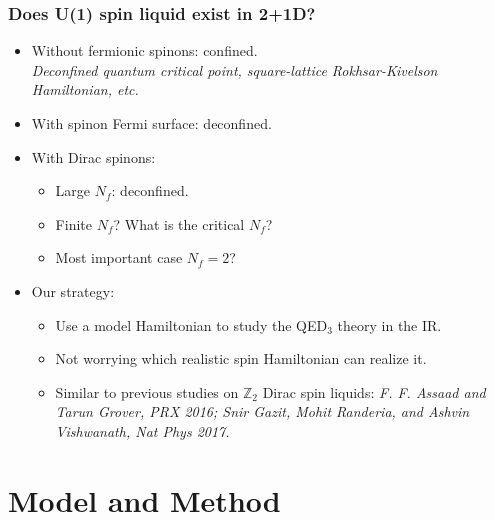 \documentclass[xcolor=table, 10pt, aspectratio=169]{beamer}
\begin{document}
\begin{frame}
  \frametitle{Does U(1) spin liquid exist in 2+1D?}
  \begin{itemize}
    \item Without fermionic spinons: confined.\\
    \emph{Deconfined quantum critical point, square-lattice Rokhsar-Kivelson Hamiltonian, etc.}
    \item With spinon Fermi surface: deconfined.
    \item With Dirac spinons:
    \begin{itemize}
      \item Large $N_f$: deconfined.
      \item Finite $N_f$? What is the critical $N_f$?
      \item Most important case $N_f=2$?
    \end{itemize}
    \item Our strategy:
    \begin{itemize}
      \item Use a model Hamiltonian to study the QED$_3$ theory in the IR.
      \item Not worrying which realistic spin Hamiltonian can realize it.
      \item Similar to previous studies on $\mathbb Z_2$ Dirac spin liquids:
      \emph{F. F. Assaad and Tarun Grover, PRX 2016; Snir Gazit, Mohit Randeria, and Ashvin Vishwanath, Nat Phys 2017.}
    \end{itemize}
  \end{itemize}
\end{frame}

\section{Model and Method}
\end{document}
